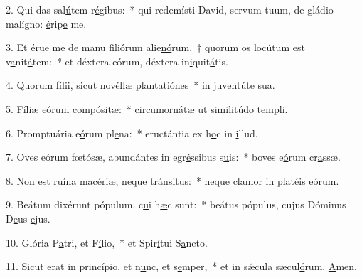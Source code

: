 2. Qui das sal\uline{ú}tem r\uline{é}gibus:~* qui redemísti David, servum tuum, de gládio malígno: \uline{é}rip\uline{e} me.\par 
3. Et érue me de manu filiórum alie\uline{nó}rum,~† quorum os locútum est v\uline{a}nit\uline{á}tem:~* et déxtera eórum, déxtera in\uline{i}quit\uline{á}tis.\par 
4. Quorum fílii, sicut novéllæ plant\uline{a}ti\uline{ó}nes~* in juvent\uline{ú}te s\uline{u}a.\par 
5. Fíliæ e\uline{ó}rum comp\uline{ó}sitæ:~* circumornátæ ut similit\uline{ú}do t\uline{e}mpli.\par 
6. Promptuária e\uline{ó}rum pl\uline{e}na:~* eructántia ex h\uline{o}c in \uline{i}llud.\par 
7. Oves eórum fœtósæ, abundántes in egr\uline{é}ssibus s\uline{u}is:~* boves e\uline{ó}rum cr\uline{a}ssæ.\par 
8. Non est ruína macériæ, n\uline{e}que tr\uline{á}nsitus:~* neque clamor in plat\uline{é}is e\uline{ó}rum.\par 
9. Beátum dixérunt pópulum, c\uline{u}i h\uline{æ}c sunt:~* beátus pópulus, cujus Dóminus D\uline{e}us \uline{e}jus.\par 
10. Glória P\uline{a}tri, et F\uline{í}lio,~* et Spir\uline{í}tui S\uline{a}ncto.\par 
11. Sicut erat in princípio, et n\uline{u}nc, et s\uline{e}mper,~* et in sǽcula sæcul\uline{ó}rum. \uline{A}men.\par 
